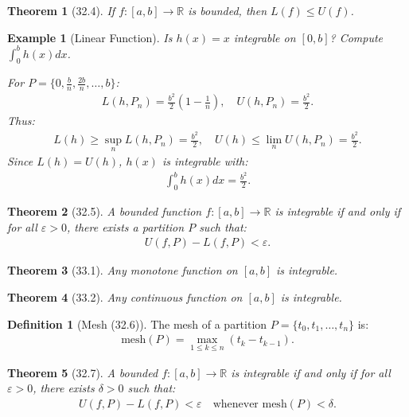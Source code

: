 \documentclass[7pt]{article}
\theoremstyle{definition}
\newtheorem{definition}{Definition}
\theoremstyle{plain}
\newtheorem{theorem}{Theorem}
\newtheorem{example}{Example}
\begin{document}
\begin{theorem}[32.4]
If $ f : [a, b] \to \mathbb{R} $ is bounded, then $ L(f) \leq U(f) $.
\end{theorem}

\begin{example}[Linear Function]
Is $ h(x) = x $ integrable on $ [0, b] $? Compute $ \int_0^b h(x) dx $.

For $ P = \{0, \frac{b}{n}, \frac{2b}{n}, \ldots, b\} $:
\begin{align}
L(h, P_n) = \frac{b^2}{2}\left(1 - \frac{1}{n}\right), \quad U(h, P_n) = \frac{b^2}{2}.
\end{align}
Thus:
\begin{align}
L(h) \geq \sup_n L(h, P_n) = \frac{b^2}{2}, \quad U(h) \leq \lim_n U(h, P_n) = \frac{b^2}{2}.
\end{align}
Since $ L(h) = U(h) $, $ h(x) $ is integrable with:
\begin{align}
\int_0^b h(x) dx = \frac{b^2}{2}.
\end{align}
\end{example}

\begin{theorem}[32.5]
A bounded function $ f : [a, b] \to \mathbb{R} $ is integrable if and only if for all $ \varepsilon > 0 $, there exists a partition $ P $ such that:
\begin{align}
U(f, P) - L(f, P) < \varepsilon.
\end{align}
\end{theorem}

\begin{theorem}[33.1]
Any monotone function on $ [a, b] $ is integrable.
\end{theorem}

\begin{theorem}[33.2]
Any continuous function on $ [a, b] $ is integrable.
\end{theorem}

\begin{definition}[Mesh (32.6)]
The mesh of a partition $ P = \{t_0, t_1, \ldots, t_n\} $ is:
\begin{align}
\text{mesh}(P) = \max_{1 \leq k \leq n} (t_k - t_{k-1}).
\end{align}
\end{definition}

\begin{theorem}[32.7]
A bounded $ f : [a, b] \to \mathbb{R} $ is integrable if and only if for all $ \varepsilon > 0 $, there exists $ \delta > 0 $ such that:
\begin{align}
U(f, P) - L(f, P) < \varepsilon \quad \text{whenever mesh}(P) < \delta.
\end{align}
\end{theorem}
\end{document}
